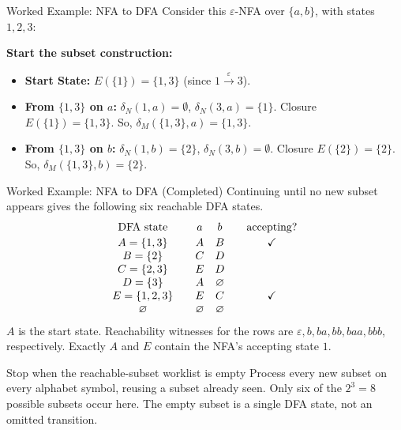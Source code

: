 \documentclass[10pt]{beamer}
\begin{document}
\begin{frame}{Worked Example: NFA to DFA}
  \small
  Consider this $\varepsilon$-NFA over $\{a,b\}$, with states $1,2,3$:
  \begin{center}
  \end{center}
  \pause
  \textbf{Start the subset construction:}
  \begin{itemize}
      \item \textbf{Start State:} $E(\{1\}) = \{1, 3\}$ (since $1 \xrightarrow{\varepsilon} 3$).
      \item \textbf{From $\{1,3\}$ on $a$:}
      $\delta_N(1, a) = \emptyset$, $\delta_N(3, a) = \{1\}$. 
      Closure $E(\{1\}) = \{1,3\}$. So, $\delta_M(\{1,3\}, a) = \{1,3\}$.
      \item \textbf{From $\{1,3\}$ on $b$:}
      $\delta_N(1, b) = \{2\}$, $\delta_N(3, b) = \emptyset$.
      Closure $E(\{2\}) = \{2\}$. So, $\delta_M(\{1,3\}, b) = \{2\}$.
  \end{itemize}
\end{frame}

\begin{frame}[label=subset-table]{Worked Example: NFA to DFA (Completed)}
  \small
  Continuing until no new subset appears gives the following six reachable
  DFA states.
  \[
  \begin{array}{c@{\qquad}cc@{\qquad}c}
    \text{DFA state} & a & b & \text{accepting?}\\[2pt]
    A=\{1,3\}     & A & B & \checkmark\\
    B=\{2\}       & C & D & \\
    C=\{2,3\}     & E & D & \\
    D=\{3\}       & A & \varnothing & \\
    E=\{1,2,3\}   & E & C & \checkmark\\
    \varnothing    & \varnothing & \varnothing &
  \end{array}
  \]
  \pause
  $A$ is the start state. Reachability witnesses for the rows are
  $\varepsilon,b,ba,bb,baa,bbb$, respectively.
  Exactly $A$ and $E$ contain the NFA's accepting state $1$.
  \begin{block}{Stop when the reachable-subset worklist is empty}
    Process every new subset on every alphabet symbol, reusing a subset
    already seen. Only six of the $2^3=8$ possible subsets occur here.
    The empty subset is a single DFA state, not an omitted transition.
  \end{block}
  \hyperlink{subset-diagram}{}
\end{frame}
\end{document}

